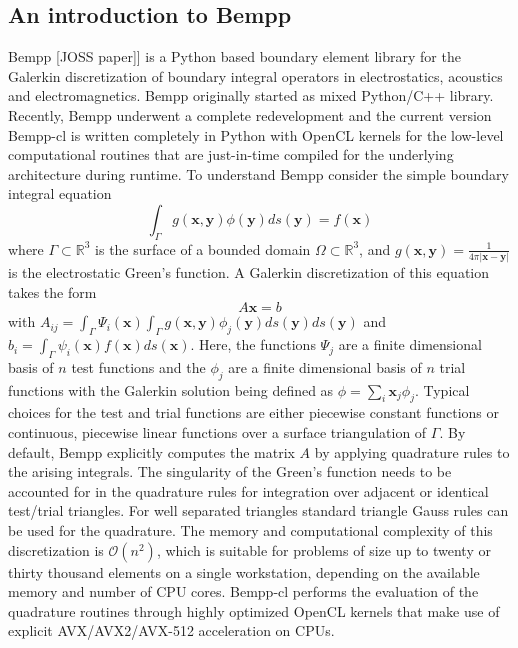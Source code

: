\subsection{An introduction to Bempp}
Bempp [JOSS paper]] is a Python based boundary element library for the Galerkin discretization of boundary integral operators in electrostatics, acoustics and electromagnetics.
Bempp originally started as mixed Python/C++ library.
Recently, Bempp underwent a complete redevelopment and the current version Bempp-cl is written completely in Python with OpenCL kernels for the low-level computational routines that are just-in-time compiled for the underlying architecture during runtime.
To understand Bempp consider the simple boundary integral equation
$$
\int_{\Gamma} g(\mathbf{x}, \mathbf{y}) \phi(\mathbf{y})ds(\mathbf{y}) = f(\mathbf{x})
$$
where $\Gamma\subset\mathbb{R}^3$ is the surface of a bounded domain $\Omega\subset\mathbb{R}^3$, and $g(\mathbf{x}, \mathbf{y}) = \frac{1}{4\pi|\mathbf{x}-\mathbf{y}|}$ is the electrostatic Green's function.
A Galerkin discretization of this equation takes the form
$$
A\mathbf{x} = b
$$
with $A_{ij} = \int_{\Gamma}\Psi_i(\mathbf{x})\int_{\Gamma}g(\mathbf{x}, \mathbf{y})\phi_j(\mathbf{y})ds(\mathbf{y})ds(\mathbf{y})$ and $b_i = \int_{\Gamma}\psi_i(\mathbf{x})f(\mathbf{x})ds(\mathbf{x})$.
Here, the functions $\Psi_j$ are a finite dimensional basis of $n$ test functions and the $\phi_j$ are a finite dimensional basis of $n$ trial functions with the Galerkin solution being defined as $\phi=\sum_{i}\mathbf{x}_j\phi_j$.
Typical choices for the test and trial functions are either piecewise constant functions or continuous, piecewise linear functions over a surface triangulation of $\Gamma$. 
By default, Bempp explicitly computes the matrix $A$ by applying quadrature rules to the arising integrals.
The singularity of the Green's function needs to be accounted for in the quadrature rules for integration over adjacent or identical test/trial triangles.
For well separated triangles standard triangle Gauss rules can be used for the quadrature.
The memory and computational complexity of this discretization is $\mathcal{O}(n^2)$, which is suitable for problems of size up to twenty or thirty thousand elements on a single workstation, depending on the available memory and number of CPU cores.
Bempp-cl performs the evaluation of the quadrature routines through highly optimized OpenCL kernels that make use of explicit AVX/AVX2/AVX-512 acceleration on CPUs.

